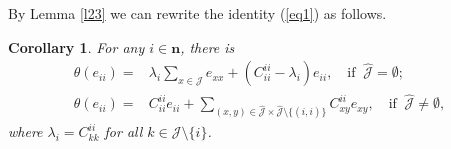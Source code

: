 \documentclass[reqno]{amsart}
\theoremstyle{plain}
\newtheorem{corollary}[theorem]{Corollary}
\theoremstyle{definition}
\begin{document}
By Lemma \ref{l23} we can rewrite the identity (\ref{eq1})
as follows.

\begin{corollary}\label{l24}
For any $i \in \mathbf{n}$, there is
\[
\begin{aligned}
\theta(e_{ii}) =& \lambda_i\sum_{x \in \mathcal{J}}  e_{xx} + (C_{ii}^{ii} - \lambda_i) e_{ii}, \quad \text{if }\ \hat{\mathcal{J}} = \emptyset;\\
\theta(e_{ii}) =& C_{ii}^{ii} e_{ii} + \sum_{(x, y) \in \hat{\mathcal{J}}\times \hat{\mathcal{J}}\setminus \{(i,i)\}} C_{xy}^{ii} e_{xy},
\quad \text{if }\ \hat{\mathcal{J}} \neq \emptyset,
\end{aligned}
\]
where $\lambda_i=C_{kk}^{ii}$ for all $k\in \mathcal{J}\setminus  \{i\}$.
\end{corollary}
\end{document}
